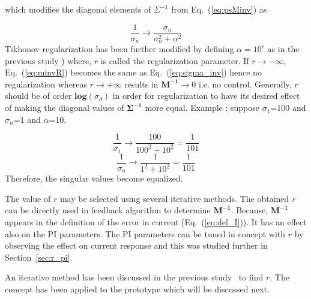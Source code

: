 which modifies the diagonal elements of $\Sigma^{-1}$ from Eq.~(\ref{eq:psMinv}) as

\begin{equation}\label{eq:minvR}
    \frac{1}{\sigma_n} \rightarrow \frac{\sigma_n}{\sigma_n^2+\alpha^2} 
\end{equation}
Tikhonov regularization has been further modified by defining $\alpha=10^r$ as in the previous study \cite{bea}) where, $r$ is called the regularization parameter. If  $r \rightarrow - \infty$, Eq.~(\ref{eq:minvR}) becomes the same as Eq.~(\ref{eq:sigma_inv}) hence no regularization whereas $r \rightarrow + \infty$ results in $\bm{M^{-1}} \rightarrow 0$ i.e. no control. Generally, $r$ should be of order $\mathbf{log}(\sigma_{d})$ in order for regularization to have its desired effect of making the diagonal values of $\bm{\Sigma^{-1}}$ more equal. Example : suppose $\sigma_1$=100 and $\sigma_n$=1 and $\alpha$=10.

\begin{equation*}
    \frac{1}{\sigma_1} \rightarrow \frac{100}{100^2+10^2}=\frac{1}{101} 
\end{equation*}
\begin{equation*}
    \frac{1}{\sigma_n} \rightarrow \frac{1}{1^2+10^2}=\frac{1}{101} 
\end{equation*}
Therefore, the singular values become equalized.

The value of $r$ may be selected using several iterative methods. The obtained $r$ can be directly used in feedback algorithm to determine $\bm{M^{-1}}$. Because, $\bm{M^{-1}}$ appears in the definition of the error in current (Eq.~(\ref{eq:del_I})). It has an effect also on the PI parameters. The PI parameters can be tuned in concept with $r$ by observing the effect on current response and this was studied further in Section~\ref{sec:r_pi}.


An iterative method has been discussed in  the previous study~\cite{bea} to find $r$. The concept has been applied to the prototype which will be discussed next.






